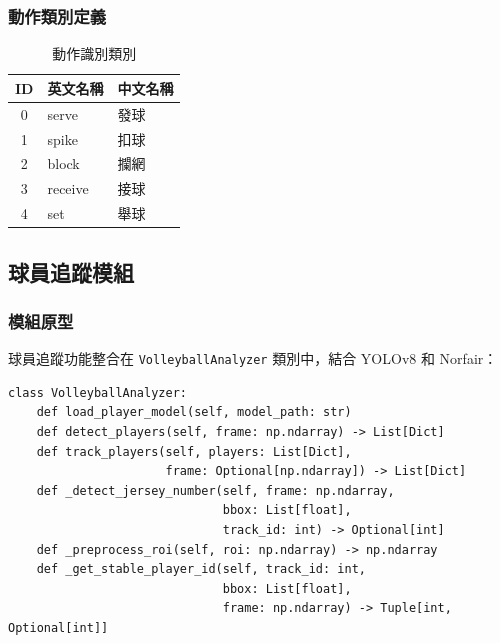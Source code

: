 \documentclass[a4paper,14pt,oneside]{article}
\begin{document}
\subsubsection{動作類別定義}
\begin{table}[H]
    \centering
    \caption{動作識別類別}
    \begin{tabular}{|c|l|l|}
        \hline
        \textbf{ID} & \textbf{英文名稱} & \textbf{中文名稱} \\
        \hline
        0 & serve & 發球 \\
        \hline
        1 & spike & 扣球 \\
        \hline
        2 & block & 攔網 \\
        \hline
        3 & receive & 接球 \\
        \hline
        4 & set & 舉球 \\
        \hline
    \end{tabular}
\end{table}

\subsection{球員追蹤模組}

\subsubsection{模組原型}
球員追蹤功能整合在 \texttt{VolleyballAnalyzer} 類別中，結合 YOLOv8 和 Norfair：

\begin{lstlisting}[style=pythonstyle, caption=球員追蹤相關方法]
class VolleyballAnalyzer:
    def load_player_model(self, model_path: str)
    def detect_players(self, frame: np.ndarray) -> List[Dict]
    def track_players(self, players: List[Dict], 
                      frame: Optional[np.ndarray]) -> List[Dict]
    def _detect_jersey_number(self, frame: np.ndarray, 
                              bbox: List[float], 
                              track_id: int) -> Optional[int]
    def _preprocess_roi(self, roi: np.ndarray) -> np.ndarray
    def _get_stable_player_id(self, track_id: int, 
                              bbox: List[float], 
                              frame: np.ndarray) -> Tuple[int, Optional[int]]
\end{lstlisting}
\end{document}
